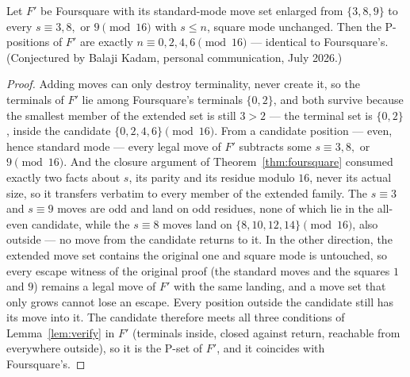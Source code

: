 \begin{proposition}\label{prop:kadam}
Let $F'$ be Foursquare with its standard-mode move set enlarged from
$\{3, 8, 9\}$ to every $s \equiv 3, 8,$ or $9 \pmod{16}$ with $s \le n$,
square mode unchanged. Then the P-positions of $F'$ are exactly
$n \equiv 0, 2, 4, 6 \pmod{16}$ --- identical to Foursquare's. (Conjectured
by Balaji Kadam, personal communication, July 2026.)
\end{proposition}
\begin{proof}
Adding moves can only destroy terminality, never create it, so the
terminals of $F'$ lie among Foursquare's terminals $\{0, 2\}$, and both
survive because the smallest member of the extended set is still $3 > 2$
--- the terminal set is $\{0, 2\}$, inside the candidate
$\{0, 2, 4, 6\} \pmod{16}$. From a candidate position --- even, hence
standard mode --- every legal move of $F'$ subtracts some
$s \equiv 3, 8,$ or $9 \pmod{16}$. And the closure argument of
Theorem~\ref{thm:foursquare} consumed exactly two facts about $s$, its
parity and its residue modulo $16$, never its actual size, so it transfers
verbatim to every member of the extended family. The $s \equiv 3$ and
$s \equiv 9$ moves are odd and land on odd residues, none of which lie in
the all-even candidate, while the $s \equiv 8$ moves land on
$\{8, 10, 12, 14\} \pmod{16}$, also outside --- no move from the candidate
returns to it. In the other direction, the extended move set contains the
original one and square mode is untouched, so every escape witness of the
original proof (the standard moves and the squares $1$ and $9$)
remains a legal move of $F'$ with the same landing, and a move set that
only grows cannot lose an escape. Every position outside the candidate
still has its move into it. The candidate therefore meets all three
conditions of Lemma~\ref{lem:verify} in $F'$ (terminals inside, closed
against return, reachable from everywhere outside), so it is the P-set
of $F'$, and it coincides with Foursquare's.
\end{proof}

